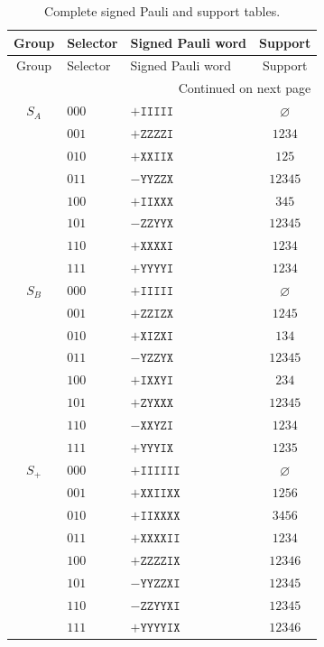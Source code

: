 \documentclass[11pt]{article}
\begin{document}
\begin{longtable}{@{}cllc@{}}
\caption{Complete signed Pauli and support tables.}\label{tab:paulis}\\
\toprule
Group & Selector & Signed Pauli word & Support\\
\midrule
\endfirsthead
\toprule
Group & Selector & Signed Pauli word & Support\\
\midrule
\endhead
\midrule
\multicolumn{4}{r}{Continued on next page}\\
\endfoot
\bottomrule
\endlastfoot
$S_A$ & $000$ & $+\mathtt{IIIII}$ & $\varnothing$\\
      & $001$ & $+\mathtt{ZZZZI}$ & $1234$\\
      & $010$ & $+\mathtt{XXIIX}$ & $125$\\
      & $011$ & $-\mathtt{YYZZX}$ & $12345$\\
      & $100$ & $+\mathtt{IIXXX}$ & $345$\\
      & $101$ & $-\mathtt{ZZYYX}$ & $12345$\\
      & $110$ & $+\mathtt{XXXXI}$ & $1234$\\
      & $111$ & $+\mathtt{YYYYI}$ & $1234$\\
$S_B$ & $000$ & $+\mathtt{IIIII}$ & $\varnothing$\\
      & $001$ & $+\mathtt{ZZIZX}$ & $1245$\\
      & $010$ & $+\mathtt{XIZXI}$ & $134$\\
      & $011$ & $-\mathtt{YZZYX}$ & $12345$\\
      & $100$ & $+\mathtt{IXXYI}$ & $234$\\
      & $101$ & $+\mathtt{ZYXXX}$ & $12345$\\
      & $110$ & $-\mathtt{XXYZI}$ & $1234$\\
      & $111$ & $+\mathtt{YYYIX}$ & $1235$\\
$S_+$ & $000$ & $+\mathtt{IIIIII}$ & $\varnothing$\\
      & $001$ & $+\mathtt{XXIIXX}$ & $1256$\\
      & $010$ & $+\mathtt{IIXXXX}$ & $3456$\\
      & $011$ & $+\mathtt{XXXXII}$ & $1234$\\
      & $100$ & $+\mathtt{ZZZZIX}$ & $12346$\\
      & $101$ & $-\mathtt{YYZZXI}$ & $12345$\\
      & $110$ & $-\mathtt{ZZYYXI}$ & $12345$\\
      & $111$ & $+\mathtt{YYYYIX}$ & $12346$\\

\end{longtable}
\end{document}

